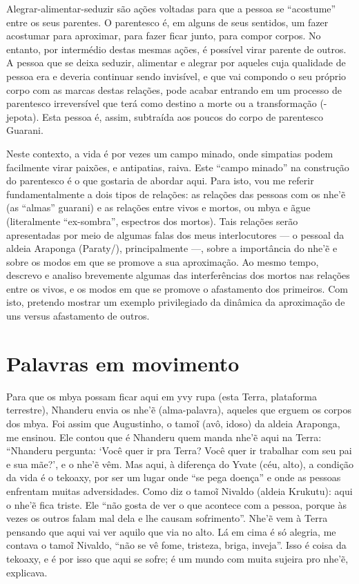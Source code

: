 Alegrar-alimentar-seduzir são ações voltadas para que a pessoa se
``acostume'' entre os seus parentes. O parentesco é, em alguns de seus
sentidos, um fazer acostumar para aproximar, para fazer ficar junto,
para compor corpos. No entanto, por intermédio destas mesmas ações, é
possível virar parente de outros. A pessoa que se deixa seduzir,
alimentar e alegrar por aqueles cuja qualidade de pessoa era e deveria
continuar sendo invisível, e que vai compondo o seu próprio corpo com
as marcas destas relações, pode acabar entrando em um processo de
parentesco irreversível que terá como destino a morte ou a
transformação (-jepota). Esta pessoa é, assim, subtraída aos poucos do
corpo de parentesco Guarani.

Neste contexto, a vida é por vezes um campo minado, onde simpatias podem
facilmente virar paixões, e antipatias, raiva. Este ``campo minado'' na
construção do parentesco é o que gostaria de abordar aqui. Para isto,
vou me referir fundamentalmente a dois tipos de relações: as relações
das pessoas com os nhe’\~{e} (as ``almas'' guarani) e as relações entre
vivos e mortos, ou mbya e ãgue (literalmente ``ex-sombra'', espectros dos
mortos). Tais relações serão apresentadas por meio de algumas falas dos
meus interlocutores — o pessoal da aldeia Araponga (Paraty/),
principalmente —, sobre a importância do nhe’\~{e} e sobre os modos
em que se promove a sua aproximação. Ao mesmo tempo, descrevo e analiso
brevemente algumas das interferências dos mortos nas relações entre os
vivos, e os modos em que se promove o afastamento dos primeiros. Com
isto, pretendo mostrar um exemplo privilegiado da dinâmica da
aproximação de uns versus afastamento de outros.

\section{Palavras em movimento}

Para que os mbya possam ficar aqui em yvy rupa (esta Terra, plataforma
terrestre), Nhanderu envia os nhe’\~{e} (alma-palavra), aqueles que
erguem os corpos dos mbya. Foi assim que Augustinho, o tamo\~{i} (avô,
idoso) da aldeia Araponga, me ensinou. Ele contou que é Nhanderu quem
manda nhe’\~{e} aqui na Terra: ``Nhanderu pergunta: ‘Você quer ir pra
Terra? Você quer ir trabalhar com seu pai e sua mãe?’, e o nhe’\~{e}
vêm. Mas aqui, à diferença do Yvate (céu, alto), a condição da vida é o
tekoaxy, por ser um lugar onde ``se pega doença'' e onde as pessoas
enfrentam muitas adversidades. Como diz o tamo\~{i} Nivaldo (aldeia
Krukutu): aqui o nhe’\~{e} fica triste. Ele ``não gosta de ver o que
acontece com a pessoa, porque às vezes os outros falam mal dela e lhe
causam sofrimento''. Nhe’\~{e} vem à Terra pensando que aqui vai ver
aquilo que via no alto. Lá em cima é só
alegria, me contava o tamo\~{i} Nivaldo, ``não se vê
fome, tristeza, briga, inveja''. Isso é coisa da tekoaxy, e é por isso
que aqui se sofre; é um mundo com muita sujeira pro
nhe’\~{e}, explicava. 

